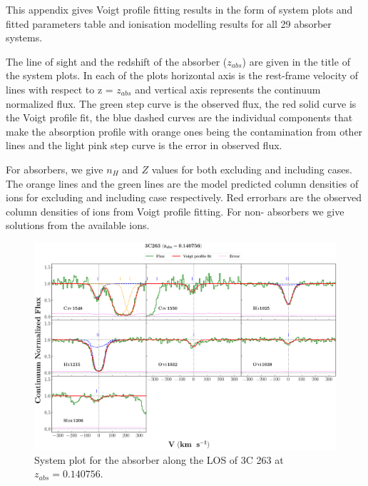  \label{ap:survey-results}

This appendix gives Voigt profile fitting results in the form of system plots and fitted parameters table and ionisation modelling results for all 29 absorber systems. 

The line of sight and the redshift of the absorber ($z_{abs}$) are given in the title of the system plots. In each of the plots horizontal axis is the rest-frame velocity of lines with respect to z = $z_{abs}$ and vertical axis represents the continuum normalized flux. The green step curve is the observed flux, the red solid curve is the Voigt profile fit, the blue dashed curves are the individual components that make the absorption profile with orange ones being the contamination from other lines and the light pink step curve is the error in observed flux.

For  absorbers, we give $n_H$ and $Z$ values for both excluding and including  cases. The orange lines and the green lines are the model predicted column densities of ions for excluding and including  case respectively. Red errorbars are the observed column densities of ions from Voigt profile fitting. For non- absorbers we give solutions from the available ions.

\newpage
\thispagestyle{empty}

\begin{landscape}

    \begin{figure}
    \centering
    \vspace{-10mm}
    \hspace*{-20mm}
    \includegraphics[width=1.1\linewidth]{System-Plots/3C263_z=0.140756_sys_plot.png}
      \caption{System plot for the absorber along the LOS of 3C 263 at $z_{abs} = 0.140756$. }
    \end{figure}
    
\end{landscape}
 

